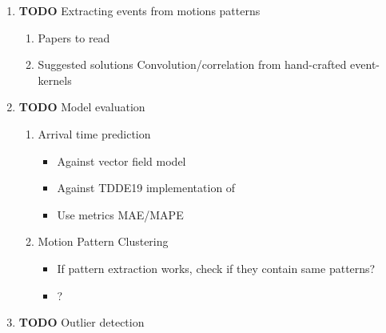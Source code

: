 \documentclass[11pt]{article}
\begin{document}
\begin{enumerate}
\begin{enumerate}
\item Suggested solutions
\label{sec:org5135482}
\begin{enumerate}
\item An additive model using Laplace approximation in posterior
\label{sec:org6eb1558}
mode. Everything would be normally distributed and computable in
closed form. The posterior arrival time of segment \(k+1\) would
be \(AT_{k}\) + \(AT_{k+1}\) where \(AT_{k}\) and \(AT_{k+1}\)
are the Laplace approximations in the mode of the posteriors 
for the corresponding model \(\mathcal{M}\). For \(\mathcal{M}_{k}\) the posterior is
computed for the current state, and for \(\mathcal{M}_{k+1}\) it
is computed either for the first data point in the frame (if
frames are implemented) or for the mean value for the first data
point in the \(k+1\) segment. This would require a model for
\(P(\(\mathcal{M}_{k+1}\) | \(\mathcal{M}_{k}\)), which could be
as simple as \(\mathcal{M}_{k+1} \sim
       Dir(\alpha_{\mathcal{M}_{k}})\), where
\(\alpha_{\mathcal{M}_{k}}\) is acquired by counting and
normalising model transitions. This would be meaningless without
proper clustering, unfortunately.
\end{enumerate}
\end{enumerate}

\item {\bfseries\sffamily TODO} Extracting events from motions patterns
\label{sec:org8bb3f7d}
\begin{enumerate}
\item Papers to read
\label{sec:org6299eb1}

\item Suggested solutions
\label{sec:org18993d5}
Convolution/correlation from hand-crafted event-kernels \cite{smith1997scientist}
\end{enumerate}

\item {\bfseries\sffamily TODO} Model evaluation
\label{sec:org5d66c4f}
\begin{enumerate}
\item Arrival time prediction
\label{sec:org0528f61}
\begin{itemize}
\item Against vector field model \cite{Tran2014Jun}
\item Against TDDE19 implementation of \cite{RNNBusPredictions}
\item Use metrics MAE/MAPE
\end{itemize}

\item Motion Pattern Clustering
\label{sec:orgc6e93de}
\begin{itemize}
\item If pattern extraction works, check if they contain same patterns?
\item ?
\end{itemize}
\end{enumerate}

\item {\bfseries\sffamily TODO} Outlier detection
\label{sec:org421afc0}
\end{enumerate}
\end{document}
